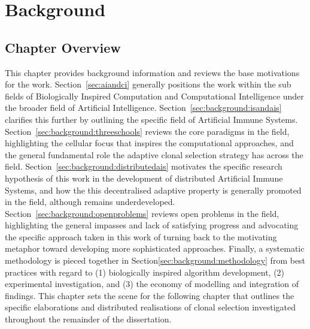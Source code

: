 
%
%





%
%
\chapter{Background}
\label{chap:background}

%
%
\section{Chapter Overview}
\label{sec:background:overview}
This chapter provides background information and reviews the base motivations for the work. 
Section~\ref{sec:aiandci} generally positions the work within the sub fields of Biologically Inspired Computation and Computational Intelligence under the broader field of Artificial Intelligence. Section~\ref{sec:background:isandais} clarifies this further by outlining the specific field of Artificial Immune Systems. 
Section~\ref{sec:background:threeschools} reviews the core paradigms in the field, highlighting the cellular focus that inspires the computational approaches, and the general fundamental role the adaptive clonal selection strategy has across the field.
Section~\ref{sec:background:distributedais} motivates the specific research hypothesis of this work in the development of distributed Artificial Immune Systems, and how the this decentralised adaptive property is generally promoted in the field, although remains underdeveloped.
Section~\ref{sec:background:openproblems} reviews open problems in the field, highlighting the general impasses and lack of satisfying progress and advocating the specific approach taken in this work of turning back to the motivating metaphor toward developing more sophisticated approaches.
Finally, a systematic methodology is pieced together in Section\ref{sec:background:methodology} from best practices with regard to (1) biologically inspired algorithm development, (2) experimental investigation, and (3) the economy of modelling and integration of findings.
This chapter sets the scene for the following chapter that outlines the specific elaborations and distributed realisations of clonal selection investigated throughout the remainder of the dissertation.


